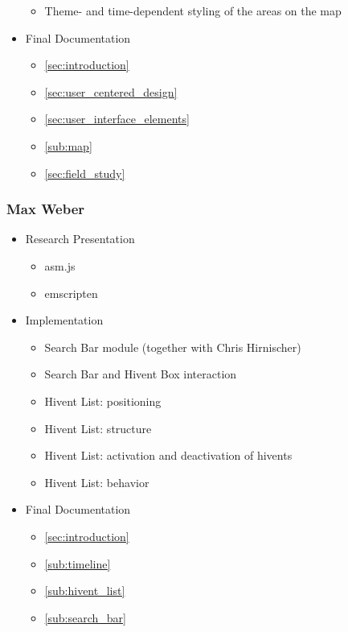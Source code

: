 \begin{itemize}
\begin{itemize}
    \item Theme- and time-dependent styling of the areas on the map
  \end{itemize}
  \item Final Documentation
  \begin{itemize}
    \item \ref{sec:introduction} 
    \item \ref{sec:user_centered_design} 
    \item \ref{sec:user_interface_elements} 
    \item \ref{sub:map} 
    \item \ref{sec:field_study} 
  \end{itemize}
\end{itemize}


\subsubsection{Max Weber} %
\label{ssub:max_weber}

\begin{itemize}
  \item Research Presentation
  \begin{itemize}
    \item asm.js
    \item emscripten
  \end{itemize}
  \item Implementation
  \begin{itemize}
    \item Search Bar module (together with Chris Hirnischer)
    \item Search Bar and Hivent Box interaction
    \item Hivent List: positioning
    \item Hivent List: structure
    \item Hivent List: activation and deactivation of hivents
    \item Hivent List: behavior
  \end{itemize}
  \item Final Documentation
  \begin{itemize}
    \item \ref{sec:introduction} 
    \item \ref{sub:timeline} 
    \item \ref{sub:hivent_list} 
    \item \ref{sub:search_bar} 
  \end{itemize}
\end{itemize}

